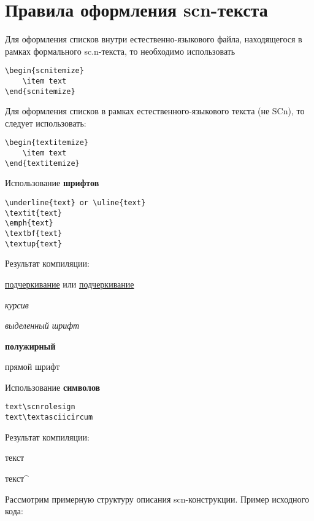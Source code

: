 \section*{Правила оформления scn-текста}

Для оформления списков внутри естественно-языкового файла, находящегося в рамках формального sc.n-текста, то необходимо использовать
\begin{lstlisting}              
\begin{scnitemize}
	\item text
\end{scnitemize}
\end{lstlisting}  

Для оформления списков в рамках естественного-языкового текста (не SCn), то следует использовать:
\begin{lstlisting}              
\begin{textitemize}
	\item text
\end{textitemize}
\end{lstlisting}  

Использование \textbf{шрифтов}

\begin{lstlisting}
\underline{text} or \uline{text}
\textit{text}
\emph{text}
\textbf{text}
\textup{text}
\end{lstlisting}

Результат компиляции:

\underline{подчеркивание} или \uline{подчер\-кивание}

\textit{курсив}

\emph{выделенный шрифт}

\textbf{полужирный}

\textup{прямой шрифт}

Использование \textbf{символов}

\begin{lstlisting}
text\scnrolesign
text\textasciicircum
\end{lstlisting}

Результат компиляции:

	текст\scnrolesign
	
	текст\textasciicircum


Рассмотрим примерную структуру описания scn-конструкции. Пример исходного кода:


